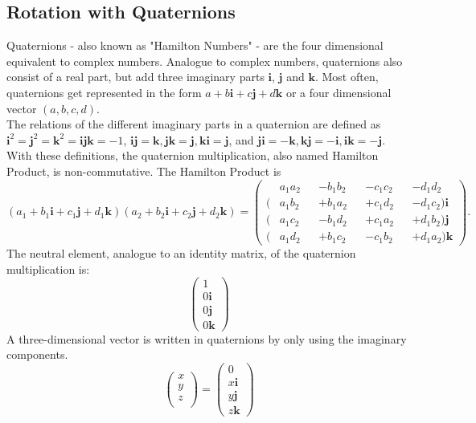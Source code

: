 \subsection{Rotation with Quaternions}
\label{sec:RotationQuaternion}
Quaternions - also known as "Hamilton Numbers" - are the four dimensional equivalent to complex numbers. Analogue to complex numbers, quaternions also consist of a real part, but add three imaginary parts $\textbf{i}$, $\textbf{j}$ and $\textbf{k}$. Most often, quaternions get represented in the form $a+b\textbf{i}+c\textbf{j}+d\textbf{k}$ or a four dimensional vector $(a, b, c, d)$.\\
The relations of the different imaginary parts in a quaternion are defined as $\textbf{i}^{2}=\textbf{j}^{2}=\textbf{k}^{2}=\textbf{ijk}=-1$, $\textbf{ij}=\textbf{k}, \textbf{jk}=\textbf{j}, \textbf{ki}=\textbf{j}$, and  $\textbf{ji}=-\textbf{k}, \textbf{kj}=-\textbf{i}, \textbf{ik}=-\textbf{j}$. With these definitions, the quaternion multiplication, also named Hamilton Product, is non-commutative. The Hamilton Product is
\begin{equation*}
    (a_{1}+b_{1}\textbf{i}+c_{1}\textbf{j}+d_{1}\textbf{k})(a_{2}+b_{2}\textbf{i}+c_{2}\textbf{j}+d_{2}\textbf{k})
    =
    \begin{pmatrix}
          & a_1a_2 &  & - b_1b_2 &  & - c_1c_2 &  & - d_1d_2             \\
        ( & a_1b_2 &  & + b_1a_2 &  & + c_1d_2 &  & - d_1c_2) \textbf{i} \\
        ( & a_1c_2 &  & - b_1d_2 &  & + c_1a_2 &  & + d_1b_2) \textbf{j} \\
        ( & a_1d_2 &  & + b_1c_2 &  & - c_1b_2 &  & + d_1a_2) \textbf{k}
    \end{pmatrix}.
\end{equation*}
The neutral element, analogue to an identity matrix, of the quaternion multiplication is:
\begin{equation*}
    \begin{pmatrix}
        1           \\
        0\textbf{i} \\
        0\textbf{j} \\
        0\textbf{k}
    \end{pmatrix}
\end{equation*}
A three-dimensional vector is written in quaternions by only using the imaginary components.
\begin{equation*}
    \begin{pmatrix}
        x \\
        y \\
        z \\
    \end{pmatrix}
    =
    \begin{pmatrix}
        0           \\
        x\textbf{i} \\
        y\textbf{j} \\
        z\textbf{k}
    \end{pmatrix}
\end{equation*}
